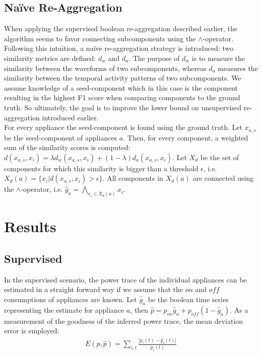  \subsection{Na\"ive Re-Aggregation}
 When applying the supervised boolean re-aggregation described earlier, the algorithm seems to favor connecting subcomponents using the $\land$-operator. Following this intuition, a na\"ive re-aggregation strategy is introduced: two similarity metrics are defined: $d_w$ and $d_a$. The purpose of $d_w$ is to measure the similarity between the waveforms of two subcomponents, whereas $d_a$ measures the similarity between the temporal activity patterns of two subcomponents. We assume knowledge of a seed-component which in this case is the component resulting in the highest F1 score when comparing components to the ground truth. So ultimately, the goal is to improve the lower bound on unsupervised re-aggregation introduced earlier.\\
 For every appliance the seed-component is found using the ground truth. Let $x_{a,s}$ be the seed-component of appliances $a$. Then, for every component, a weighted sum of the similarity scores is computed: $d(x_{a,s}, x_i) = \lambda d_w(x_{a,s}, x_i) + (1-\lambda) d_a(x_{a,s}, x_i)$. Let $X_d$ be the set of components for which this similarity is bigger than a threshold $\epsilon$, i.e. $X_d(a) = \{x_i | d(x_{a,s}, x_i) > \epsilon\}$. All components in $X_d(a)$ are connected using the $\land$-operator, i.e. $\hat{g}_a = \bigwedge_{x_i \in X_d(a)} x_i$.
 
 \section{Results}
 \subsection{Supervised}
 In the supervised scenario, the power trace of the individual appliances can be estimated in a straight forward way if we assume that the $on$ and $off$ consumptions of appliances are known. Let $\hat{g}_a$ be the boolean time series representing the estimate for appliance $a$, then $\hat{p} = p_{on} \hat{g}_a  + p_{off}(1-\hat{g}_a)$. As a measurement of the goodness of the inferred power trace, the mean deviation error is employed: \begin{align*}
E(p, \hat{p}) = \sum_{i,t} \frac{|p_i(t) - \hat{p}_i(t)|}{p_i(t)}
\end{align*}


